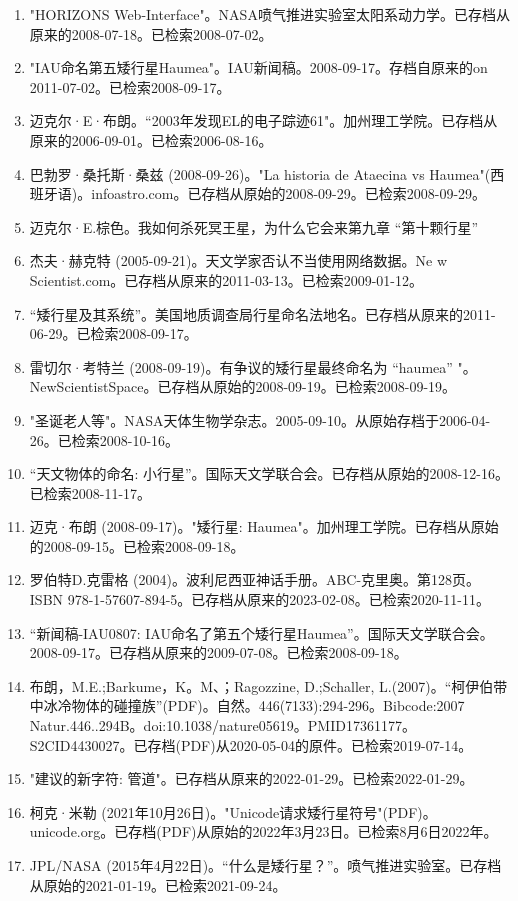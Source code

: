 \begin{enumerate}
\item "HORIZONS Web-Interface"。NASA喷气推进实验室太阳系动力学。已存档从原来的2008-07-18。已检索2008-07-02。
\item "IAU命名第五矮行星Haumea"。IAU新闻稿。2008-09-17。存档自原来的on 2011-07-02。已检索2008-09-17。
\item 迈克尔·E·布朗。“2003年发现EL的电子踪迹61"。加州理工学院。已存档从原来的2006-09-01。已检索2006-08-16。
\item 巴勃罗·桑托斯·桑兹 (2008-09-26)。"La historia de Ataecina vs Haumea"(西班牙语)。infoastro.com。已存档从原始的2008-09-29。已检索2008-09-29。
\item 迈克尔·E.棕色。我如何杀死冥王星，为什么它会来第九章 “第十颗行星”
\item 杰夫·赫克特 (2005-09-21)。天文学家否认不当使用网络数据。Ne w Scientist.com。已存档从原来的2011-03-13。已检索2009-01-12。
\item “矮行星及其系统”。美国地质调查局行星命名法地名。已存档从原来的2011-06-29。已检索2008-09-17。
\item 雷切尔·考特兰 (2008-09-19)。有争议的矮行星最终命名为 “haumea” "。NewScientistSpace。已存档从原始的2008-09-19。已检索2008-09-19。
\item "圣诞老人等"。NASA天体生物学杂志。2005-09-10。从原始存档于2006-04-26。已检索2008-10-16。
\item “天文物体的命名: 小行星”。国际天文学联合会。已存档从原始的2008-12-16。已检索2008-11-17。
\item 迈克·布朗 (2008-09-17)。"矮行星: Haumea"。加州理工学院。已存档从原始的2008-09-15。已检索2008-09-18。
\item 罗伯特D.克雷格 (2004)。波利尼西亚神话手册。ABC-克里奥。第128页。ISBN 978-1-57607-894-5。已存档从原来的2023-02-08。已检索2020-11-11。
\item “新闻稿-IAU0807: IAU命名了第五个矮行星Haumea”。国际天文学联合会。2008-09-17。已存档从原来的2009-07-08。已检索2008-09-18。
\item 布朗，M.E.;Barkume，K。M、；Ragozzine, D.;Schaller, L.(2007)。“柯伊伯带中冰冷物体的碰撞族”(PDF)。自然。446(7133):294-296。Bibcode:2007 Natur.446..294B。doi:10.1038/nature05619。PMID17361177。S2CID4430027。已存档(PDF)从2020-05-04的原件。已检索2019-07-14。   
\item "建议的新字符: 管道"。已存档从原来的2022-01-29。已检索2022-01-29。
\item 柯克·米勒 (2021年10月26日)。"Unicode请求矮行星符号"(PDF)。unicode.org。已存档(PDF)从原始的2022年3月23日。已检索8月6日2022年。
\item JPL/NASA (2015年4月22日)。“什么是矮行星？”。喷气推进实验室。已存档从原始的2021-01-19。已检索2021-09-24。

\end{enumerate}
